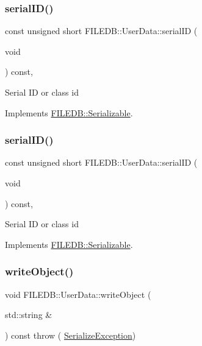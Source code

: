 \subsubsection{\texorpdfstring{serialID()}{serialID()}\hspace{0.1cm}{\footnotesize\ttfamily [1/2]}}
{\footnotesize\ttfamily const unsigned short F\+I\+L\+E\+D\+B\+::\+User\+Data\+::serial\+ID (\begin{DoxyParamCaption}\item[{void}]{ }\end{DoxyParamCaption}) const\hspace{0.3cm}{\ttfamily [inline]}, {\ttfamily [virtual]}}

Serial ID or class id 

Implements \mbox{\hyperlink{classFILEDB_1_1Serializable_a5d639b5dbd5d8ebc7dca1eca31bbc868}{F\+I\+L\+E\+D\+B\+::\+Serializable}}.

\mbox{\label{classFILEDB_1_1UserData_a2d1cee48b497ef3f25957ecb1464b7f5}} 
\subsubsection{\texorpdfstring{serialID()}{serialID()}\hspace{0.1cm}{\footnotesize\ttfamily [2/2]}}
{\footnotesize\ttfamily const unsigned short F\+I\+L\+E\+D\+B\+::\+User\+Data\+::serial\+ID (\begin{DoxyParamCaption}\item[{void}]{ }\end{DoxyParamCaption}) const\hspace{0.3cm}{\ttfamily [inline]}, {\ttfamily [virtual]}}

Serial ID or class id 

Implements \mbox{\hyperlink{classFILEDB_1_1Serializable_a5d639b5dbd5d8ebc7dca1eca31bbc868}{F\+I\+L\+E\+D\+B\+::\+Serializable}}.

\mbox{\label{classFILEDB_1_1UserData_a42b5e25b3cba7274363590c5b6861795}} 
\subsubsection{\texorpdfstring{writeObject()}{writeObject()}\hspace{0.1cm}{\footnotesize\ttfamily [1/2]}}
{\footnotesize\ttfamily void F\+I\+L\+E\+D\+B\+::\+User\+Data\+::write\+Object (\begin{DoxyParamCaption}\item[{std\+::string \&}]{ }\end{DoxyParamCaption}) const throw ( \mbox{\hyperlink{classFILEDB_1_1SerializeException}{Serialize\+Exception}}) \hspace{0.3cm}{\ttfamily [virtual]}}

